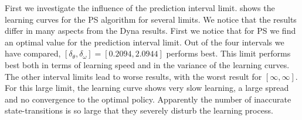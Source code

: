 First we investigate the influence of the prediction interval limit.  shows the learning curves for the \ac{PS} algorithm for several limits. We notice that the results differ in many aspects from the Dyna results. First we notice that for \ac{PS} we find an optimal value for the prediction interval limit. Out of the four intervals we have compared, $[\delta_\theta,\delta_\omega]=[0.2094,2.0944]$ performs best. This limit performs best both in terms of learning speed and in the variance of the learning curves. The other interval limits lead to worse results, with the worst result for $[\infty, \infty]$. For this large limit, the learning curve shows very slow learning, a large spread and no convergence to the optimal policy. Apparently the number of inaccurate state-transitions is so large that they severely disturb the learning process.

